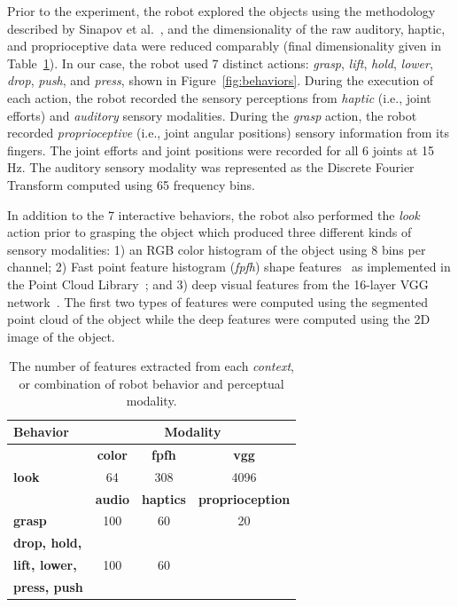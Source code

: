 Prior to the experiment, the robot explored the objects using the methodology described by Sinapov et al.~, and the dimensionality of the raw auditory, haptic, and proprioceptive data were reduced comparably (final dimensionality given in Table~\ref{tab:feature_space_of_contexts}).
In our case, the robot used 7 distinct actions: {\it grasp}, {\it lift}, {\it hold}, {\it lower}, {\it drop}, {\it push}, and {\it press}, shown in Figure~\ref{fig:behaviors}.
During the execution of each action, the robot recorded the sensory perceptions from {\it haptic} (i.e., joint efforts) and {\it auditory} sensory modalities.
During the {\it grasp} action, the robot recorded {\it proprioceptive} (i.e., joint angular positions) sensory information from its fingers.
The joint efforts and joint positions were recorded for all 6 joints at 15 Hz.
The auditory sensory modality was represented as the Discrete Fourier Transform computed using 65 frequency bins.

In addition to the 7 interactive behaviors, the robot also performed the {\it look} action prior to grasping the object which produced three different kinds of sensory modalities: 1) an RGB color histogram of the object using 8 bins per channel; 2) Fast point feature histogram ({\it fpfh}) shape features~\cite{rusu:icra09} as implemented in the Point Cloud Library~\cite{aldoma:ram12}; and 3) deep visual features from the 16-layer VGG network~\cite{simonyan:corr14}.
The first two types of features were computed using the segmented point cloud of the object while the deep features were computed using the 2D image of the object. 

\begin{table}
\centering
\begin{tabular}[h]{|l|c|c|c|}
	\hline
	\bf Behavior & \multicolumn{3}{c|}{\bf Modality} \\ \hline \hline
	& \bf color & \bf fpfh & \bf vgg \\ \hline
	\bf look & 64 & 308 & 4096 \\ \hline \hline
	& \bf audio & \bf haptics & \bf proprioception \\ \hline
	\bf grasp & 100 & 60 & 20 \\ \hline
	\bf drop, hold, & & & \\
	\bf lift, lower, & 100 & 60 & \\
	\bf press, push & & & \\ \hline
\end{tabular}
\caption{The number of features extracted from each \textit{context}, or combination of robot behavior and perceptual modality.}
\label{tab:feature_space_of_contexts}
\end{table}

